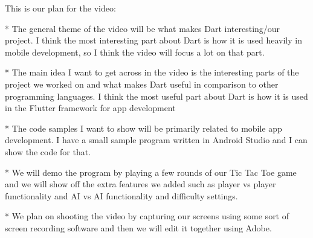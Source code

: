 This is our plan for the video:


* The general theme of the video will be what makes Dart interesting/our project. I think the most interesting part about Dart is how it is used heavily in mobile development, so I think the video will focus a lot on that part.

* The main idea I want to get across in the video is the interesting parts of the project we worked on and what makes Dart useful
in comparison to other programming languages. I think the most useful part about Dart is how it is used in the Flutter framework for app development

* The code samples I want to show will be primarily related to mobile app development. I have a small sample program written in Android Studio and I can show the code for that.

* We will demo the program by playing a few rounds of our Tic Tac Toe game and we will show off the extra features we added
such as player vs player functionality and AI vs AI functionality and difficulty settings. 

* We plan on shooting the video by capturing our screens using some sort of screen recording software and then we will edit it together using Adobe.

